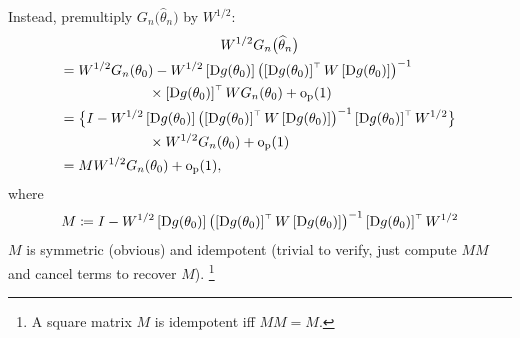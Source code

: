 \documentclass[11pt,letterpaper,reqno,oneside]{article}
\begin{document}
Instead, premultiply $G_n\bigl( \widehat{\theta}_n \bigr)$ by $W^{1/2}$:
%
\begin{multline*}
	W^{1/2} G_n\bigl( \widehat{\theta}_n \bigr)
	\\
	\begin{aligned}
		={}& W^{1/2} G_n( \theta_0 )
		- W^{1/2} \left[ \mathrm{D} g( \theta_0 ) \right] 
		\left( \left[ \mathrm{D} g(\theta_0) \right]^{\scriptscriptstyle \top} 
		W \left[ \mathrm{D} g(\theta_0) \right] \right)^{-1}
		\\
		&\quad\quad\quad\quad\quad\times
		\left[ \mathrm{D} g(\theta_0) \right]^{\scriptscriptstyle \top} W G_n(\theta_0)
		+ \mathrm{o}_{\mathrm{p}}(1) 
		\\
		={}& \bigl\{ I
		- W^{1/2} \left[ \mathrm{D} g( \theta_0 ) \right] 
		\left( \left[ \mathrm{D} g(\theta_0) \right]^{\scriptscriptstyle \top} 
		W \left[ \mathrm{D} g(\theta_0) \right] \right)^{-1}
		\left[ \mathrm{D} g(\theta_0) \right]^{\scriptscriptstyle \top} W^{1/2} \bigr\}
		\\
		&\quad\quad\quad\quad\quad\times
		W^{1/2} G_n( \theta_0 )	+ \mathrm{o}_{\mathrm{p}}(1) 
		\\
		={}& M W^{1/2} G_n( \theta_0 ) + \mathrm{o}_{\mathrm{p}}(1) ,
	\end{aligned}
\end{multline*}
%
where
%
\begin{equation*}
	M \coloneqq I
	- W^{1/2} \left[ \mathrm{D} g( \theta_0 ) \right] 
	\left( \left[ \mathrm{D} g(\theta_0) \right]^{\scriptscriptstyle \top} 
	W \left[ \mathrm{D} g(\theta_0) \right] \right)^{-1}
	\left[ \mathrm{D} g(\theta_0) \right]^{\scriptscriptstyle \top} W^{1/2}
\end{equation*}
%
$M$ is symmetric (obvious) and idempotent (trivial to verify, just compute $MM$ and cancel terms to recover $M$).%
	\footnote{A square matrix $M$ is idempotent iff $MM=M$.}
\end{document}
